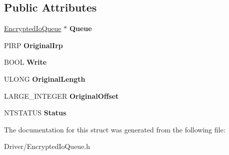 \subsection*{Public Attributes}
\begin{DoxyCompactItemize}
\item 
\mbox{\label{struct_encrypted_io_queue_item_a69d9e4378e18acc66c61a74d08f7b51e}} 
\hyperlink{struct_encrypted_io_queue}{Encrypted\+Io\+Queue} $\ast$ {\bfseries Queue}
\item 
\mbox{\label{struct_encrypted_io_queue_item_a66a49d744203fd87c322702e6373cba3}} 
P\+I\+RP {\bfseries Original\+Irp}
\item 
\mbox{\label{struct_encrypted_io_queue_item_a5bf50c71ebc403dac5da920a8d2f1cf6}} 
B\+O\+OL {\bfseries Write}
\item 
\mbox{\label{struct_encrypted_io_queue_item_a741cbd2bdde106450034e2c9071c5d8f}} 
U\+L\+O\+NG {\bfseries Original\+Length}
\item 
\mbox{\label{struct_encrypted_io_queue_item_a66db79e51baa9c68b2c19e26ab7fe593}} 
L\+A\+R\+G\+E\+\_\+\+I\+N\+T\+E\+G\+ER {\bfseries Original\+Offset}
\item 
\mbox{\label{struct_encrypted_io_queue_item_a38e2165dde77d215fd724a885fde0c67}} 
N\+T\+S\+T\+A\+T\+US {\bfseries Status}
\end{DoxyCompactItemize}


The documentation for this struct was generated from the following file\+:\begin{DoxyCompactItemize}
\item 
Driver/Encrypted\+Io\+Queue.\+h\end{DoxyCompactItemize}
